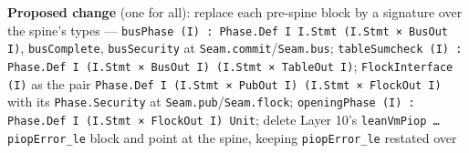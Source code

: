 \textbf{Proposed change} (one for all): replace each pre-spine block by a signature over the spine's types — \texttt{b\allowbreak{}u\allowbreak{}s\allowbreak{}P\allowbreak{}h\allowbreak{}a\allowbreak{}s\allowbreak{}e\allowbreak{} (\allowbreak{}I\allowbreak{})\allowbreak{} :\allowbreak{} P\allowbreak{}h\allowbreak{}a\allowbreak{}s\allowbreak{}e\allowbreak{}.\allowbreak{}D\allowbreak{}e\allowbreak{}f\allowbreak{} I\allowbreak{} I\allowbreak{}.\allowbreak{}S\allowbreak{}t\allowbreak{}m\allowbreak{}t\allowbreak{} (\allowbreak{}I\allowbreak{}.\allowbreak{}S\allowbreak{}t\allowbreak{}m\allowbreak{}t\allowbreak{} ×\allowbreak{} B\allowbreak{}u\allowbreak{}s\allowbreak{}O\allowbreak{}u\allowbreak{}t\allowbreak{} I\allowbreak{})}, \texttt{busComplete}, \texttt{busSecurity} at \texttt{Seam.\allowbreak{}commit}/\texttt{Seam.\allowbreak{}bus}; \texttt{t\allowbreak{}a\allowbreak{}b\allowbreak{}l\allowbreak{}e\allowbreak{}S\allowbreak{}u\allowbreak{}m\allowbreak{}c\allowbreak{}h\allowbreak{}e\allowbreak{}c\allowbreak{}k\allowbreak{} (\allowbreak{}I\allowbreak{})\allowbreak{} :\allowbreak{} P\allowbreak{}h\allowbreak{}a\allowbreak{}s\allowbreak{}e\allowbreak{}.\allowbreak{}D\allowbreak{}e\allowbreak{}f\allowbreak{} I\allowbreak{} (\allowbreak{}I\allowbreak{}.\allowbreak{}S\allowbreak{}t\allowbreak{}m\allowbreak{}t\allowbreak{} ×\allowbreak{} B\allowbreak{}u\allowbreak{}s\allowbreak{}O\allowbreak{}u\allowbreak{}t\allowbreak{} I\allowbreak{})\allowbreak{} (\allowbreak{}I\allowbreak{}.\allowbreak{}S\allowbreak{}t\allowbreak{}m\allowbreak{}t\allowbreak{} ×\allowbreak{} T\allowbreak{}a\allowbreak{}b\allowbreak{}l\allowbreak{}e\allowbreak{}O\allowbreak{}u\allowbreak{}t\allowbreak{} I\allowbreak{})}; \texttt{FlockInterface (\allowbreak{}I)} as the pair \texttt{P\allowbreak{}h\allowbreak{}a\allowbreak{}s\allowbreak{}e\allowbreak{}.\allowbreak{}D\allowbreak{}e\allowbreak{}f\allowbreak{} I\allowbreak{} (\allowbreak{}I\allowbreak{}.\allowbreak{}S\allowbreak{}t\allowbreak{}m\allowbreak{}t\allowbreak{} ×\allowbreak{} P\allowbreak{}u\allowbreak{}b\allowbreak{}O\allowbreak{}u\allowbreak{}t\allowbreak{} I\allowbreak{})\allowbreak{} (\allowbreak{}I\allowbreak{}.\allowbreak{}S\allowbreak{}t\allowbreak{}m\allowbreak{}t\allowbreak{} ×\allowbreak{} F\allowbreak{}l\allowbreak{}o\allowbreak{}c\allowbreak{}k\allowbreak{}O\allowbreak{}u\allowbreak{}t\allowbreak{} I\allowbreak{})} with its \texttt{Phase.\allowbreak{}Security} at \texttt{Seam.\allowbreak{}pub}/\texttt{Seam.\allowbreak{}flock}; \texttt{o\allowbreak{}p\allowbreak{}e\allowbreak{}n\allowbreak{}i\allowbreak{}n\allowbreak{}g\allowbreak{}P\allowbreak{}h\allowbreak{}a\allowbreak{}s\allowbreak{}e\allowbreak{} (\allowbreak{}I\allowbreak{})\allowbreak{} :\allowbreak{} P\allowbreak{}h\allowbreak{}a\allowbreak{}s\allowbreak{}e\allowbreak{}.\allowbreak{}D\allowbreak{}e\allowbreak{}f\allowbreak{} I\allowbreak{} (\allowbreak{}I\allowbreak{}.\allowbreak{}S\allowbreak{}t\allowbreak{}m\allowbreak{}t\allowbreak{} ×\allowbreak{} F\allowbreak{}l\allowbreak{}o\allowbreak{}c\allowbreak{}k\allowbreak{}O\allowbreak{}u\allowbreak{}t\allowbreak{} I\allowbreak{})\allowbreak{} U\allowbreak{}n\allowbreak{}i\allowbreak{}t}; delete Layer 10's \texttt{leanVmPiop … piopError\_\allowbreak{}le} block and point at the spine, keeping \texttt{piopError\_\allowbreak{}le} restated over 